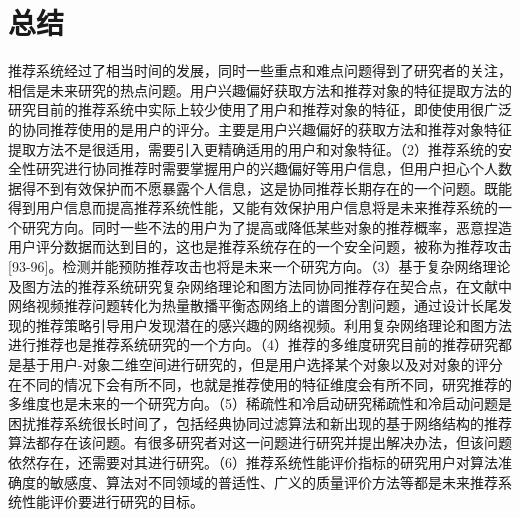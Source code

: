   \section{总结}
  推荐系统经过了相当时间的发展，同时一些重点和难点问题得到了研究者的关注，相信是未来研究的热点问题。用户兴趣偏好获取方法和推荐对象的特征提取方法的研究目前的推荐系统中实际上较少使用了用户和推荐对象的特征，即使使用很广泛的协同推荐使用的是用户的评分。主要是用户兴趣偏好的获取方法和推荐对象特征提取方法不是很适用，需要引入更精确适用的用户和对象特征。（2）推荐系统的安全性研究进行协同推荐时需要掌握用户的兴趣偏好等用户信息，但用户担心个人数据得不到有效保护而不愿暴露个人信息，这是协同推荐长期存在的一个问题。既能得到用户信息而提高推荐系统性能，又能有效保护用户信息将是未来推荐系统的一个研究方向。同时一些不法的用户为了提高或降低某些对象的推荐概率，恶意捏造用户评分数据而达到目的，这也是推荐系统存在的一个安全问题，被称为推荐攻击[93-96]。检测并能预防推荐攻击也将是未来一个研究方向。（3）基于复杂网络理论及图方法的推荐系统研究复杂网络理论和图方法同协同推荐存在契合点，在文献中网络视频推荐问题转化为热量散播平衡态网络上的谱图分割问题，通过设计长尾发现的推荐策略引导用户发现潜在的感兴趣的网络视频。利用复杂网络理论和图方法进行推荐也是推荐系统研究的一个方向。（4）推荐的多维度研究目前的推荐研究都是基于用户-对象二维空间进行研究的，但是用户选择某个对象以及对对象的评分在不同的情况下会有所不同，也就是推荐使用的特征维度会有所不同，研究推荐的多维度也是未来的一个研究方向。（5）稀疏性和冷启动研究稀疏性和冷启动问题是困扰推荐系统很长时间了，包括经典协同过滤算法和新出现的基于网络结构的推荐算法都存在该问题。有很多研究者对这一问题进行研究并提出解决办法，但该问题依然存在，还需要对其进行研究。（6）推荐系统性能评价指标的研究用户对算法准确度的敏感度、算法对不同领域的普适性、广义的质量评价方法等都是未来推荐系统性能评价要进行研究的目标。